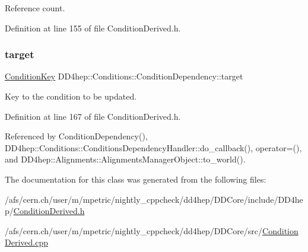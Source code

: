 Reference count. 



Definition at line 155 of file Condition\+Derived.\+h.

\hypertarget{class_d_d4hep_1_1_conditions_1_1_condition_dependency_a1a6c5ef0f44fa4c97fda1f750dd81dc2}{}\label{class_d_d4hep_1_1_conditions_1_1_condition_dependency_a1a6c5ef0f44fa4c97fda1f750dd81dc2} 
\subsubsection{\texorpdfstring{target}{target}}
{\footnotesize\ttfamily \hyperlink{class_d_d4hep_1_1_conditions_1_1_condition_key}{Condition\+Key} D\+D4hep\+::\+Conditions\+::\+Condition\+Dependency\+::target}



Key to the condition to be updated. 



Definition at line 167 of file Condition\+Derived.\+h.



Referenced by Condition\+Dependency(), D\+D4hep\+::\+Conditions\+::\+Conditions\+Dependency\+Handler\+::do\+\_\+callback(), operator=(), and D\+D4hep\+::\+Alignments\+::\+Alignments\+Manager\+Object\+::to\+\_\+world().



The documentation for this class was generated from the following files\+:\begin{DoxyCompactItemize}
\item 
/afs/cern.\+ch/user/m/mpetric/nightly\+\_\+cppcheck/dd4hep/\+D\+D\+Core/include/\+D\+D4hep/\hyperlink{_condition_derived_8h}{Condition\+Derived.\+h}\item 
/afs/cern.\+ch/user/m/mpetric/nightly\+\_\+cppcheck/dd4hep/\+D\+D\+Core/src/\hyperlink{_condition_derived_8cpp}{Condition\+Derived.\+cpp}\end{DoxyCompactItemize}
